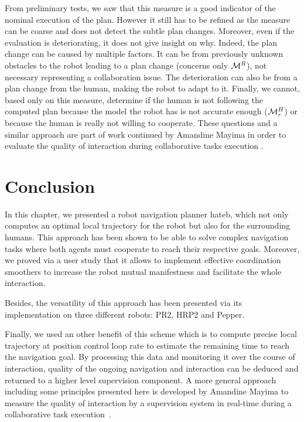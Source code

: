 \documentclass[a4paper,11pt,twoside]{StyleThese}
\begin{document}
From preliminary tests, we saw that this measure is a good indicator of the nominal execution of the plan. However it still has to be refined as the measure can be coarse and does not detect the subtle plan changes. Moreover, even if the evaluation is deteriorating, it does not give insight on why. Indeed, the plan change can be caused by multiple factors. It can be from previously unknown obstacles to the robot leading to a plan change (concerns only $\mathcal{M}^R$), not necessary representing a collaboration issue. The deterioration can also be from a plan change from the human, making the robot to adapt to it. Finally, we cannot, based only on this measure, determine if the human is not following the computed plan because the model the robot has is not accurate enough ($\mathcal{M}^H_r$) or because the human is really not willing to cooperate. These questions and a similar approach are part of work continued by Amandine Mayima in order to evaluate the quality of interaction during collaborative tasks execution \cite{mayima2020toward}.

\section{Conclusion}

In this chapter, we presented a robot navigation planner \acrshort{hateb}, which not only computes an optimal local trajectory for the robot but also for the surrounding humans. This approach has been shown to be able to solve complex navigation tasks where both agents must cooperate to reach their respective goals. Moreover, we proved via a user study that it allows to implement effective coordination smoothers to increase the robot mutual manifestness and facilitate the whole interaction.

Besides, the versatility of this approach has been presented via its implementation on three different robots: PR2, HRP2 and Pepper.


Finally, we used an other benefit of this scheme which is to compute precise local trajectory at position control loop rate to estimate the remaining time to reach the navigation goal. By processing this data and monitoring it over the course of interaction, quality of the ongoing navigation and interaction can be deduced and returned to a higher level supervision component. A more general approach including some principles presented here is developed by Amandine Mayima to measure the quality of interaction by a supervision system in real-time during a collaborative task execution~\cite{mayima2020toward}.
\end{document}
